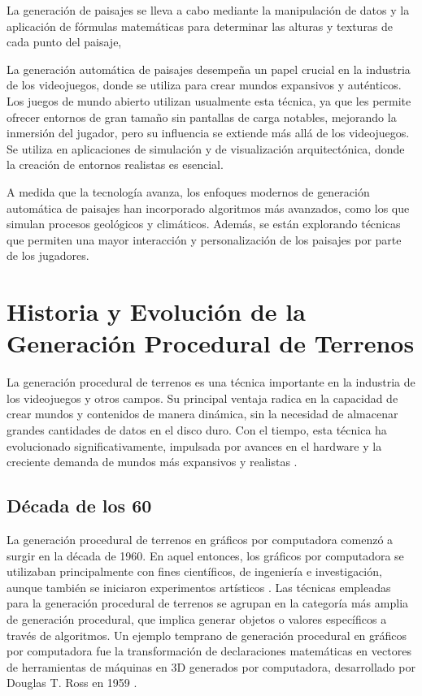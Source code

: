 La generación de paisajes se lleva a cabo mediante la manipulación de datos y la aplicación de fórmulas matemáticas para determinar las alturas y texturas de cada punto del paisaje, 

La generación automática de paisajes desempeña un papel crucial en la industria de los videojuegos, donde se utiliza para crear mundos expansivos y auténticos. Los juegos de mundo abierto utilizan usualmente esta técnica, ya que les permite ofrecer entornos de gran tamaño sin pantallas de carga notables, mejorando la inmersión del jugador, pero su influencia se extiende más allá de los videojuegos. Se utiliza en aplicaciones de simulación y de  visualización arquitectónica, donde la creación de entornos realistas es esencial.

A medida que la tecnología avanza, los enfoques modernos de generación automática de paisajes han incorporado algoritmos más avanzados, como los que simulan procesos geológicos y climáticos. Además, se están explorando técnicas que permiten una mayor interacción y personalización de los paisajes por parte de los jugadores.

\section{Historia y Evolución de la Generación Procedural de Terrenos}

La generación procedural de terrenos es una técnica importante en la industria de los videojuegos y otros campos. Su principal ventaja radica en la capacidad de crear mundos y contenidos de manera dinámica, sin la necesidad de almacenar grandes cantidades de datos en el disco duro. Con el tiempo, esta técnica ha evolucionado significativamente, impulsada por avances en el hardware y la creciente demanda de mundos más expansivos y realistas  \cite{HistoryofComputerAnimation}.

\subsection{Década de los 60}

La generación procedural de terrenos en gráficos por computadora comenzó a surgir en la década de 1960. En aquel entonces, los gráficos por computadora se utilizaban principalmente con fines científicos, de ingeniería e investigación, aunque también se iniciaron experimentos artísticos \cite{ComputerGraphicsLearningMaterials}. Las técnicas empleadas para la generación procedural de terrenos se agrupan en la categoría más amplia de generación procedural, que implica generar objetos o valores específicos a través de algoritmos. Un ejemplo temprano de generación procedural en gráficos por computadora fue la transformación de declaraciones matemáticas en vectores de herramientas de máquinas en 3D generados por computadora, desarrollado por Douglas T. Ross en 1959 \cite{ComputerGraphics}.

